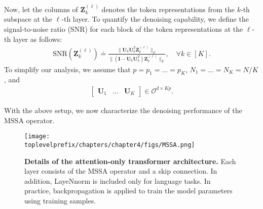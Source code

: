 \documentclass[../../book-main.tex]{subfiles}
\begin{document}
Now, let the columns of $\bm Z_k^{(\ell)}$ denotes the token representations from the $k$-th subspace at the $\ell$-th layer. To quantify the denoising capability, we define the signal-to-noise ratio (SNR) for each block of the token representations at the $\ell$-th layer as follows: 
\begin{align}\label{def:SNR}
\mathrm{SNR}(\bm Z_k^{(\ell)}) \doteq  \frac{\|\bm U_k\bm U_k^T\bm Z_k^{(\ell)} \|_F}{\|(\bm I - \bm U_k\bm U_k^T)\bm Z_k^{(\ell)} \|_F},\quad \forall k \in [K].
\end{align}
To simplify our analysis, we assume that $p=p_1=\dots=p_K$, $N_1=\dots=N_K=N/K$, and 
\begin{align}\label{eq:orth}
\begin{bmatrix}
\bm U_1 & \dots & \bm U_K
\end{bmatrix} \in \mathcal{O}^{d\times Kp}. 
\end{align}  

With the above setup, we now characterize the denoising performance of the MSSA operator.

\begin{figure*}[t]
\begin{center}
        \texttt{[image: \\toplevelprefix/chapters/chapter4/figs/MSSA.png]}
    \caption{\textbf{Details of the attention-only transformer architecture.} Each layer consists of the MSSA operator and a skip connection. In addition, LayeNnorm is included only for language tasks. In practice, backpropagation is applied to train the model parameters using training samples. %
    }\label{fig:transformer}
\end{center} 
\end{figure*}
\end{document}
